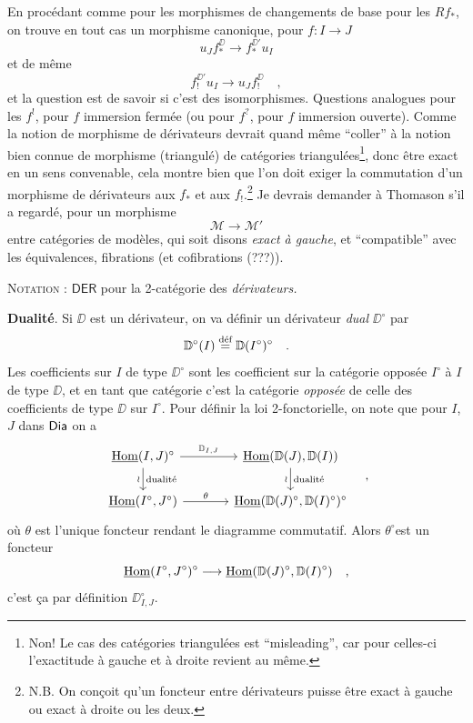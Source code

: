 En procédant comme pour les morphismes de changements de base pour les $Rf_*$, on trouve en tout cas un morphisme canonique, pour $f : I \to J$
\[
u_Jf_*^{\DD} \longrightarrow f_*^{\DD'}u_I
\]
%
et de même
\[
f_!^{\DD'}u_I \longrightarrow u_Jf_!^{\DD} \quad ,
\]
et la question est de savoir si c’est des isomorphismes. Questions analogues pour les $f^!$, pour $f$ immersion fermée (ou pour $f^?$, pour $f$ immersion ouverte). Comme la notion de morphisme de dérivateurs devrait quand même “coller” à la notion bien connue de morphisme (triangulé) de catégories triangulées\footnote[8]{Non! Le cas des catégories triangulées est “misleading”, car pour celles-ci l’exactitude à gauche et à droite revient au même.}, donc être exact en un sens convenable, cela montre bien que l’on doit exiger la commutation d’un morphisme de dérivateurs aux $f_*$ et aux $f_!$.\footnote[9]{N.B. On conçoit qu’un foncteur entre dérivateurs puisse être exact à gauche ou exact à droite ou les deux.} Je devrais demander à Thomason s’il a regardé, pour un morphisme
\[
\mathcal{M} \longrightarrow \mathcal{M}'
\]
entre catégories de modèles, qui soit disons \textit{exact à gauche}, et “compatible” avec les équivalences, fibrations (et cofibrations (???)).

\noindent\textsc{Notation} : $\mathsf{DER}$ pour la 2-catégorie des \textit{dérivateurs.}

\noindent{}\textbf{Dualité}. Si $\DD$ est un dérivateur, on va définir un dérivateur \textit{dual} $\DD^\circ$ par
\[
\DD^\circ(I) \defeq \DD(I^\circ)^\circ \quad .
\]
Les coefficients sur $I$ de type $\DD^\circ$ sont les coefficient sur la catégorie opposée $I^\circ$ à $I$ de type $\DD$, et en tant que catégorie c’est la catégorie \textit{opposée} de celle des coefficients de type $\DD$ sur $I^\circ$. Pour définir la loi 2-fonctorielle, on note que pour $I$, $J$ dans $\Dia$ on a %
\[
\begin{tikzcd}[column sep=large]
\uHom(I,J)^\circ \arrow[r, "\DD_{I,J}"] \arrow[d, "\wr"', "\text{dualité}"] & \uHom(\DD(J),\DD(I)) \arrow[d, "\wr"', "\text{dualité}"] \\
\uHom(I^\circ,J^\circ) \arrow[r, "\theta"] & \uHom(\DD(J)^\circ,\DD(I)^\circ)^\circ
\end{tikzcd}
\quad ,
\]
où $\theta$ est l’unique foncteur rendant le diagramme commutatif. Alors $\theta^\circ$est un foncteur
\[
\uHom(I^\circ,J^\circ)^\circ \longrightarrow \uHom(\DD(J)^\circ,\DD(I)^\circ) \quad ,
\]
c’est ça par définition $\DD^\circ_{I,J}$.

